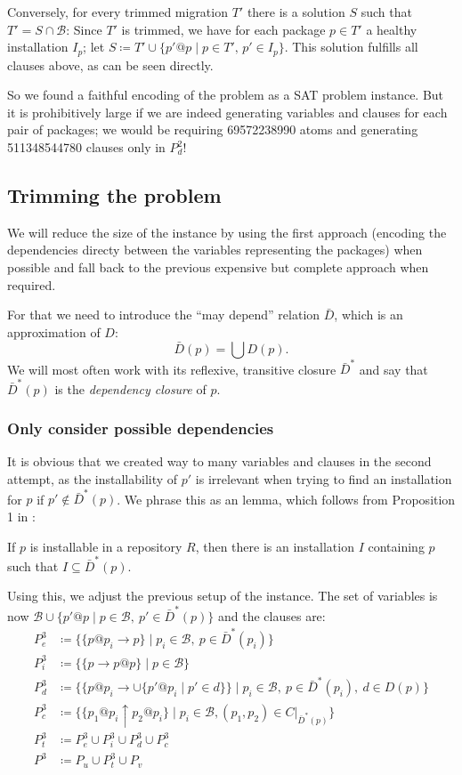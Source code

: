 \documentclass[halfparskip,11pt]{scrartcl}
\begin{document}
Conversely, for every trimmed migration $T'$ there is a solution $S$ such that $T' = S \cap \mathcal B$: Since $T'$ is trimmed, we have for each package $p\in T'$ a healthy installation $I_p$; let $S \coloneqq T' \cup \{p'@p \mid p\in T',\, p'\in I_p\}$. This solution fulfills all clauses above, as can be seen directly. 

So we found a faithful encoding of the problem as a SAT problem instance. But it is prohibitively large if we are indeed generating variables and clauses for each pair of packages; we would be requiring 69572238990 atoms and generating 511348544780 clauses only in $P^2_d$!

\subsection{Trimming the problem}

We will reduce the size of the instance by using the first approach (encoding the dependencies directy between the variables representing the packages) when possible and fall back to the previous expensive but complete approach when required.

For that we need to introduce the “may depend” relation $\bar D$, which is an approximation of $D$:
\[
\bar D(p) = \bigcup D(p).
\]
We will most often work with its reflexive, transitive closure $\bar D^*$ and say that $\bar D^*(p)$ is the \emph{dependency closure} of $p$.

\subsubsection{Only consider possible dependencies}

It is obvious that we created way to many variables and clauses in the second attempt, as the installability of $p'$ is irrelevant when trying to find an installation for $p$ if $p'\notin \bar D^*(p)$. We phrase this as an lemma, which follows from Proposition 1 in \cite{edos}:
\begin{lemma}
If $p$ is installable in a repository $R$, then there is an installation $I$ containing $p$ such that $I\subseteq \bar D^*(p)$.
\label{instrestr}
\end{lemma}

Using this, we adjust the previous setup of the instance. The set of variables is now $\mathcal B \cup \{p'@p \mid p \in \mathcal B,\  p'\in \bar D^*(p)\}$ and the clauses are: 
\begin{align*}
P^3_e &\coloneqq \{ \{p@p_i \to p\} \mid p_i \in\mathcal B,\ p\in \bar D^*(p_i)\} \\
P^3_i &\coloneqq \{ \{p \to  p@p\} \mid p \in\mathcal B\} \\
P^3_d &\coloneqq \{ \{p@p_i \to \cup \{p'@p_i \mid p'\in d\}\} \mid p_i\in \mathcal B,\ p\in \bar D^*(p_i),\ d \in D(p)\}\\
P^3_c &\coloneqq \{ \{p_1@p_i \uparrow p_2@p_i\} \mid p_i\in \mathcal B, (p_1,p_2)\in C|_{\bar D^*(p)}\}\\
P^3_t &\coloneqq P^3_e \cup P^3_i \cup P^3_d \cup P^3_c \\
P^3 &\coloneqq P_u \cup P^3_t \cup P_v
\end{align*}
\end{document}
